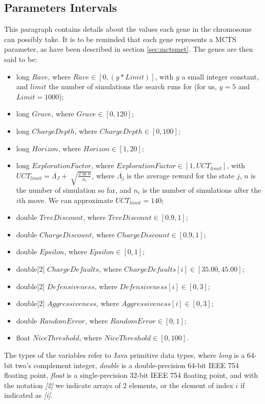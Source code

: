 \subsection{Parameters Intervals} This paragraph contains details about the values each gene in the chromosome can possibly take. It is to be reminded that each gene represents a MCTS parameter, as have been described in section \ref{sec:mctsmet}.
The genes are then said to be:
\begin{itemize}
\item long $Rave$, where $Rave \in [0,(y*Limit)]$, with $y$ a small integer constant, and $limit$ the number of simulations the search runs for (for us, $y=5$ and $Limit=1000$);
	\item long $Grave$, where $Grave \in [0, 120]$;
	\item long $Charge Depth$, where $Charge Depth \in [0,100]$;
	\item long $Horizon$, where $Horizon \in [1,20]$;
	\item long $Exploration Factor$, where $Exploration Factor \in [1,UCT_{limit}]$, with \\$UCT_{limit} = \overline{\Lambda_J}+\sqrt[]{\frac{2 \ln n}{n_i}}$, where $\overline{\Lambda_j}$ is the average reward for the state $j$, $n$ is the number of simulation so far, and $n_i$ is the number of simulations after the $i$th move. We can approximate $UCT_{limit}=140$;
	\item double $Tree Discount$, where $Tree Discount \in [0.9,1]$;
	\item double $Charge Discount$, where $Charge Discount \in [0.9,1]$;
	\item double $Epsilon$, where $Epsilon \in [0,1]$;
    \item double[2] $Charge Defaults$, where $Charge Defaults[i] \in [35.00,45.00]$;
	\item double[2] $Defensiveness$, where $Defensiveness[i] \in [0,3]$;
	\item double[2] $Aggressiveness$, where $Aggressiveness[i] \in [0,3]$;
    \item double $Random Error$, where $Random Error \in [0,1]$;
    \item float $Nice Threshold$, where $Nice Threshold \in [0,100]$.
\end{itemize}
The types of the variables refer to Java primitive data types\cite{javadatatypes}, where \emph{long} is a 64-bit two's complement integer, \emph{double} is a double-precision 64-bit IEEE 754 floating point, \emph{float} is a single-precision 32-bit IEEE 754 floating point, and with the notation \emph{[2]} we indicate arrays of 2 elements, or the element of index $i$ if indicated as \emph{[i]}.
